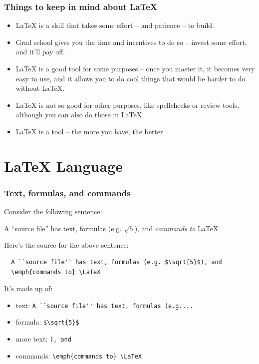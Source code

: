 \documentclass[xcolor=dvipsnames]{beamer} %
\begin{document}
\begin{frame}
  \frametitle{Things to keep in mind about \LaTeX}
  \begin{itemize}
    \item \LaTeX{} is a skill that takes some effort -- and patience -- to
          build. \pause
    \item Grad school gives you the time and incentives to do so -- invest
          some effort, and it'll pay off. \pause
    \item \LaTeX{} is a good tool for some purposes -- once you master it,
          it becomes very easy to use, and it allows you to do cool things
          that would be harder to do without \LaTeX. \pause
    \item \LaTeX{} is not so good for other purposes, like spellchecks or
          review tools, although you can also do those in \LaTeX. \pause
    \item \LaTeX{} is a tool -- the more you have, the better.
  \end{itemize}
\end{frame}


\section{\LaTeX{} Language}

\begin{frame}[fragile]
  \frametitle{Text, formulas, and commands}

  Consider the following sentence:

  \begin{center}
    A ``source file'' has text, formulas (e.g. $\sqrt{5}$), and \emph{commands to} \LaTeX
  \end{center}
  \pause
  Here's the source for the above sentence:

  \begin{lstlisting}
  A ``source file'' has text, formulas (e.g. $\sqrt{5}$), and
  \emph{commands to} \LaTeX
  \end{lstlisting}
  \pause
  It's made up of:

  \begin{itemize}
    \item text: \verb+A ``source file'' has text, formulas (e.g....+
    \item formula: \verb+$\sqrt{5}$+
    \item more text: \verb+), and+
    \item commands: \verb+\emph{commands to} \LaTeX+
  \end{itemize}

\end{frame}
\end{document}
